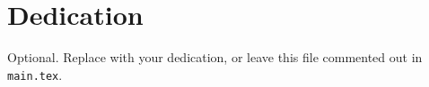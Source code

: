 \chapter*{Dedication}

Optional. Replace with your dedication, or leave this file commented out in \texttt{main.tex}.
